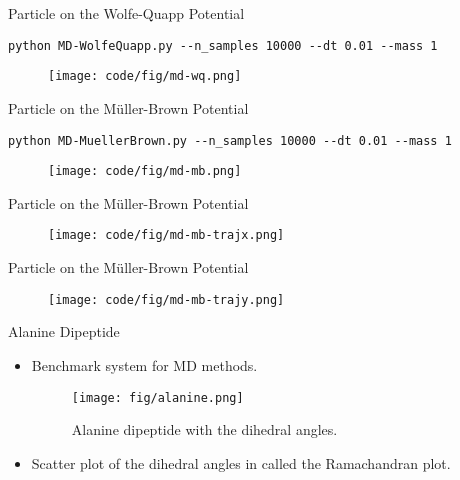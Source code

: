 \documentclass[10pt]{beamer}
\begin{document}
\begin{frame}[fragile]{Particle on the Wolfe-Quapp Potential}
\begin{lstlisting}
python MD-WolfeQuapp.py --n_samples 10000 --dt 0.01 --mass 1
\end{lstlisting}
\vspace*{-0.3cm}
\begin{figure}
  \texttt{[image: code/fig/md-wq.png]}
\end{figure}
\end{frame}

\begin{frame}[fragile]{Particle on the M\"uller-Brown Potential}
\begin{lstlisting}
python MD-MuellerBrown.py --n_samples 10000 --dt 0.01 --mass 1
\end{lstlisting}
\vspace*{-0.3cm}
\begin{figure}
  \texttt{[image: code/fig/md-mb.png]}
\end{figure}
\end{frame}

\begin{frame}{Particle on the M\"uller-Brown Potential}
\begin{figure}
  \texttt{[image: code/fig/md-mb-trajx.png]}
\end{figure}
\end{frame}

\begin{frame}{Particle on the M\"uller-Brown Potential}
\begin{figure}
  \texttt{[image: code/fig/md-mb-trajy.png]}
\end{figure}
\end{frame}

\begin{frame}{Alanine Dipeptide}
\begin{itemize}
\setlength\itemsep{1em}
  \item Benchmark system for MD methods.
  \begin{figure}
    \texttt{[image: fig/alanine.png]}
    \caption{Alanine dipeptide with the dihedral angles.}
  \end{figure}

  \item Scatter plot of the dihedral angles in called the Ramachandran plot.
\end{itemize}
\end{frame}
\end{document}
